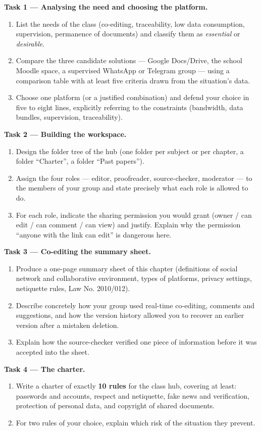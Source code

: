 \documentclass[11pt]{article}
\newcommand{\cle}[1]{{\popxbold\color{popdark}#1}}
\begin{document}
\textbf{Task 1 — Analysing the need and choosing the platform.}
\begin{enumerate}
\item List the needs of the class (co-editing, traceability, low data consumption, supervision, permanence of documents) and classify them as \emph{essential} or \emph{desirable}.
\item Compare the three candidate solutions — Google Docs/Drive, the school Moodle space, a supervised WhatsApp or Telegram group — using a comparison table with at least five criteria drawn from the situation's data.
\item Choose one platform (or a justified combination) and defend your choice in five to eight lines, explicitly referring to the constraints (bandwidth, data bundles, supervision, traceability).
\end{enumerate}

\textbf{Task 2 — Building the workspace.}
\begin{enumerate}
\item Design the folder tree of the hub (one folder per subject or per chapter, a folder ``Charter'', a folder ``Past papers'').
\item Assign the four roles — \cle{editor}, \cle{proofreader}, \cle{source-checker}, \cle{moderator} — to the members of your group and state precisely what each role is allowed to do.
\item For each role, indicate the sharing permission you would grant (owner / can edit / can comment / can view) and justify. Explain why the permission ``anyone with the link can edit'' is dangerous here.
\end{enumerate}

\textbf{Task 3 — Co-editing the summary sheet.}
\begin{enumerate}
\item Produce a one-page summary sheet of this chapter (definitions of social network and collaborative environment, types of platforms, privacy settings, netiquette rules, Law No. 2010/012).
\item Describe concretely how your group used real-time co-editing, comments and suggestions, and how the \cle{version history} allowed you to recover an earlier version after a mistaken deletion.
\item Explain how the source-checker verified one piece of information before it was accepted into the sheet.
\end{enumerate}

\textbf{Task 4 — The charter.}
\begin{enumerate}
\item Write a charter of exactly \textbf{10 rules} for the class hub, covering at least: passwords and accounts, respect and netiquette, fake news and verification, protection of personal data, and copyright of shared documents.
\item For two rules of your choice, explain which risk of the situation they prevent.
\end{enumerate}
\end{document}
